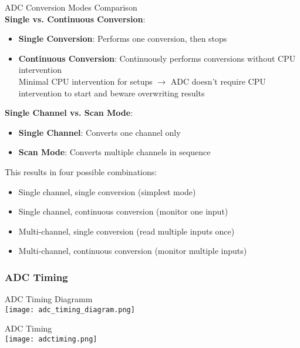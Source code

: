 \begin{concept}{ADC Conversion Modes Comparison}\\
\textbf{Single vs. Continuous Conversion}:
\begin{itemize}
    \item \textbf{Single Conversion}: Performs one conversion, then stops
    \item \textbf{Continuous Conversion}: Continuously performs conversions without CPU intervention\\
    Minimal CPU intervention for setups $\rightarrow$ ADC doesn't require CPU intervention to start and beware overwriting results
\end{itemize}
\textbf{Single Channel vs. Scan Mode}:
\begin{itemize}
    \item \textbf{Single Channel}: Converts one channel only
    \item \textbf{Scan Mode}: Converts multiple channels in sequence
\end{itemize}
This results in four possible combinations:
\begin{itemize}
    \item Single channel, single conversion (simplest mode)
    \item Single channel, continuous conversion (monitor one input)
    \item Multi-channel, single conversion (read multiple inputs once)
    \item Multi-channel, continuous conversion (monitor multiple inputs)
\end{itemize}

\end{concept}

\subsubsection{ADC Timing}

\begin{KR}{ADC Timing Diagramm}\\
    \texttt{[image: adc\_timing\_diagram.png]}
\end{KR}

\begin{concept}{ADC Timing}\\
    \texttt{[image: adctiming.png]}
\end{concept}




\raggedcolumns
\columnbreak

